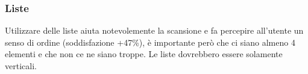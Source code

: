 \subsubsection{Liste}
Utilizzare delle liste aiuta notevolemente la scansione e fa percepire all'utente un senso di ordine (soddisfazione +47\%), è importante però che ci siano almeno 4 elementi e che non ce ne siano troppe.
Le liste dovrebbero essere solamente verticali.













